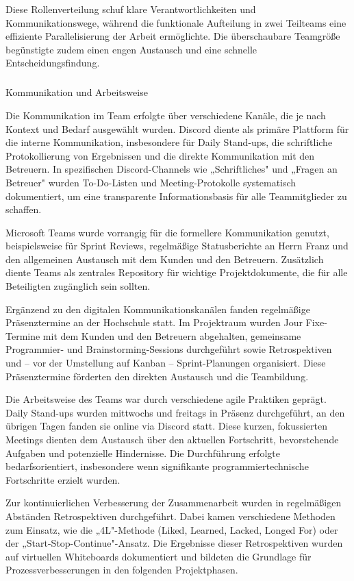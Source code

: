 Diese Rollenverteilung schuf klare Verantwortlichkeiten und Kommunikationswege, während die funktionale Aufteilung in zwei Teilteams eine effiziente Parallelisierung der Arbeit ermöglichte. Die überschaubare Teamgröße begünstigte zudem einen engen Austausch und eine schnelle Entscheidungsfindung.

\subparagraph{}{Kommunikation und Arbeitsweise}

Die Kommunikation im Team erfolgte über verschiedene Kanäle, die je nach Kontext und Bedarf ausgewählt wurden. Discord diente als primäre Plattform für die interne Kommunikation, insbesondere für Daily Stand-ups, die schriftliche Protokollierung von Ergebnissen und die direkte Kommunikation mit den Betreuern. In spezifischen Discord-Channels wie „Schriftliches" und „Fragen an Betreuer" wurden To-Do-Listen und Meeting-Protokolle systematisch dokumentiert, um eine transparente Informationsbasis für alle Teammitglieder zu schaffen.

Microsoft Teams wurde vorrangig für die formellere Kommunikation genutzt, beispielsweise für Sprint Reviews, regelmäßige Statusberichte an Herrn Franz und den allgemeinen Austausch mit dem Kunden und den Betreuern. Zusätzlich diente Teams als zentrales Repository für wichtige Projektdokumente, die für alle Beteiligten zugänglich sein sollten.

Ergänzend zu den digitalen Kommunikationskanälen fanden regelmäßige Präsenztermine an der Hochschule statt. Im Projektraum wurden Jour Fixe-Termine mit dem Kunden und den Betreuern abgehalten, gemeinsame Programmier- und Brainstorming-Sessions durchgeführt sowie Retrospektiven und – vor der Umstellung auf Kanban – Sprint-Planungen organisiert. Diese Präsenztermine förderten den direkten Austausch und die Teambildung.

Die Arbeitsweise des Teams war durch verschiedene agile Praktiken geprägt. Daily Stand-ups wurden mittwochs und freitags in Präsenz durchgeführt, an den übrigen Tagen fanden sie online via Discord statt. Diese kurzen, fokussierten Meetings dienten dem Austausch über den aktuellen Fortschritt, bevorstehende Aufgaben und potenzielle Hindernisse. Die Durchführung erfolgte bedarfsorientiert, insbesondere wenn signifikante programmiertechnische Fortschritte erzielt wurden.

Zur kontinuierlichen Verbesserung der Zusammenarbeit wurden in regelmäßigen Abständen Retrospektiven durchgeführt. Dabei kamen verschiedene Methoden zum Einsatz, wie die „4L"-Methode (Liked, Learned, Lacked, Longed For) oder der „Start-Stop-Continue"-Ansatz. Die Ergebnisse dieser Retrospektiven wurden auf virtuellen Whiteboards dokumentiert und bildeten die Grundlage für Prozessverbesserungen in den folgenden Projektphasen.

